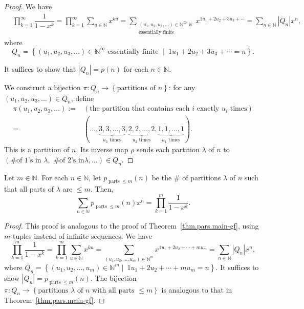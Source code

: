 \begin{proof}
We have%
\begin{align*}
&  \prod_{k=1}^{\infty}\dfrac{1}{1-x^{k}}
=\prod_{k=1}^{\infty}\sum_{u\in\mathbb{N}}x^{ku}
=\sum_{\substack{\left(  u_{1},u_{2},u_{3},\ldots\right)  \in
\mathbb{N}^{\infty}\text{ is}\\\text{essentially finite}}}x^{1u_{1}%
+2u_{2}+3u_{3}+\cdots}
=\sum_{n\in\mathbb{N}}\left\vert Q_{n}\right\vert x^{n},
\end{align*}
where
\[
Q_{n}=\left\{  \left(  u_{1},u_{2},u_{3},\ldots\right)  \in\mathbb{N}^{\infty
}\text{ essentially finite }\mid\ 1u_{1}+2u_{2}+3u_{3}+\cdots=n\right\}  .
\]

It suffices to show that $\left\vert Q_{n}\right\vert =p\left(  n\right)  $ for each $n\in\mathbb{N}$.

We construct a bijection $\pi:Q_{n}\rightarrow\left\{  \text{partitions of }n\right\}  $:
for any $\left(  u_{1},u_{2},u_{3},\ldots\right)  \in Q_{n}$, define
\begin{align*}
\pi\left(  u_{1},u_{2},u_{3},\ldots\right)  :=  &  \left(  \text{the partition
that contains each }i\text{ exactly }u_{i}\text{ times}\right) \\
=  &  \left(  \ldots,\underbrace{3,3,\ldots,3}_{u_{3}\text{ times}%
},\underbrace{2,2,\ldots,2}_{u_{2}\text{ times}},\underbrace{1,1,\ldots
,1}_{u_{1}\text{ times}}\right)  .
\end{align*}
This is a partition of $n$. Its inverse map $\rho$ sends each partition $\lambda$ of $n$ to
$\left(  \text{\# of }1\text{'s in }\lambda,\text{ \# of }2\text{'s in
}\lambda, \ldots\right)  \in Q_{n}$.
\end{proof}

\begin{theorem}
\label{thm.pars.main-gf-parts-n}
\leantarget
\leanok
Let $m\in\mathbb{N}$. For each $n\in
\mathbb{N}$, let $p_{\operatorname{parts}\leq m}\left(  n\right)  $ be the \#
of partitions $\lambda$ of $n$ such that all parts of $\lambda$ are $\leq m$.
Then,
\[
\sum_{n\in\mathbb{N}}p_{\operatorname{parts}\leq m}\left(  n\right)
x^{n}=\prod_{k=1}^{m}\dfrac{1}{1-x^{k}}.
\]
\end{theorem}

\begin{proof}
This proof is analogous to the proof of Theorem~\ref{thm.pars.main-gf},
using $m$-tuples instead of infinite sequences.
We have
\[
\prod_{k=1}^{m}\dfrac{1}{1-x^{k}}=\prod_{k=1}^{m}\sum_{u\in
\mathbb{N}}x^{ku}=\sum_{\left(  u_{1},u_{2},\ldots,u_{m}\right)  \in\mathbb{N}^{m}}%
x^{1u_{1}+2u_{2}+\cdots+mu_{m}}=\sum_{n\in\mathbb{N}}\left\vert Q_{n}%
\right\vert x^{n},
\]
where
$Q_{n}=\left\{  \left(  u_{1},u_{2},\ldots,u_{m}\right)  \in\mathbb{N}%
^{m} \mid\ 1u_{1}+2u_{2}+\cdots+mu_{m}=n\right\}$.
It suffices to show $\left\vert Q_{n}\right\vert =p_{\operatorname{parts}\leq m}\left(  n\right)$.
The bijection $\pi:Q_{n}\rightarrow\left\{  \text{partitions }\lambda\text{ of }n\text{ with
all parts }\leq m\right\}  $ is analogous to that in Theorem~\ref{thm.pars.main-gf}.
\end{proof}

